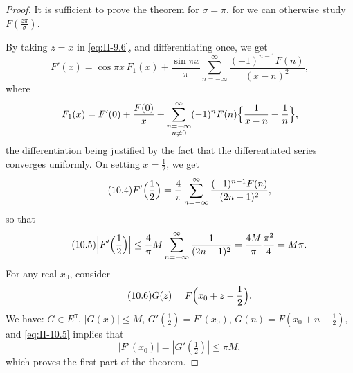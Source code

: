 \begin{proof}
It is sufficient to prove the theorem for $\sigma=\pi$, for we can otherwise study $F(\frac{z\pi}{\sigma})$.

By taking $z=x$ in \eqref{eq:II-9.6}, and differentiating once, we get
\begin{equation}\tag{10.3}\label{eq:II-10.3}
F'(x)=\cos\pi x\,F_{1}(x)+\frac{\sin\pi x}{\pi}\sum_{n=-\infty}^{\infty}\frac{(-1)^{n-1}F(n)}{(x-n)^{2}},
\end{equation}
where
\[
F_{1}(x)=F'(0)+\frac{F(0)}{x}
+\sum_{\substack{n=-\infty\\ n\neq 0}}^{\infty}(-1)^{n}F(n)\Bigl\{\frac{1}{x-n}+\frac{1}{n}\Bigr\},
\]
the differentiation being justified by the fact that the differentiated series converges uniformly. On setting $x=\frac{1}{2}$, we get
\begin{equation}\tag{10.4}\label{eq:II-10.4}
F'\Bigl(\frac{1}{2}\Bigr)=\frac{4}{\pi}\sum_{n=-\infty}^{\infty}\frac{(-1)^{n-1}F(n)}{(2n-1)^{2}},
\end{equation}
so that
\begin{equation}\tag{10.5}\label{eq:II-10.5}
\Bigl|F'\Bigl(\frac{1}{2}\Bigr)\Bigr|\le\frac{4}{\pi}M\sum_{n=-\infty}^{\infty}\frac{1}{(2n-1)^{2}}
=\frac{4M}{\pi}\frac{\pi^{2}}{4}=M\pi.
\end{equation}
For any real $x_{0}$, consider
\begin{equation}\tag{10.6}\label{eq:II-10.6}
G(z)=F\Bigl(x_{0}+z-\frac{1}{2}\Bigr).
\end{equation}
We have: $G\in E^{\pi}$, $|G(x)|\le M$, $G'(\frac{1}{2})=F'(x_{0})$, $G(n)=F(x_{0}+n-\frac{1}{2})$, and \eqref{eq:II-10.5} implies that
\[
|F'(x_{0})|=|G'(\tfrac{1}{2})|\le\pi M,
\]
which proves the first part of the theorem.


\end{proof}
